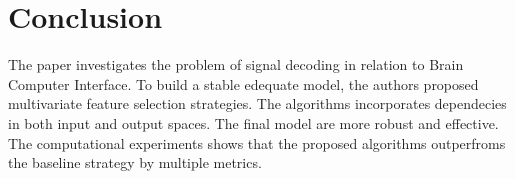 \documentclass[12pt,twoside]{article}
\theoremstyle{definition}
\begin{document}
\section{Conclusion}
The paper investigates the problem of signal decoding in relation to Brain Computer Interface. 
To build a stable edequate model, the authors proposed multivariate feature selection strategies. 
The algorithms incorporates dependecies in both input and output spaces. 
The final model are more robust and effective.
The computational experiments shows that the proposed algorithms outperfroms the baseline strategy by multiple metrics. 



\end{document}
